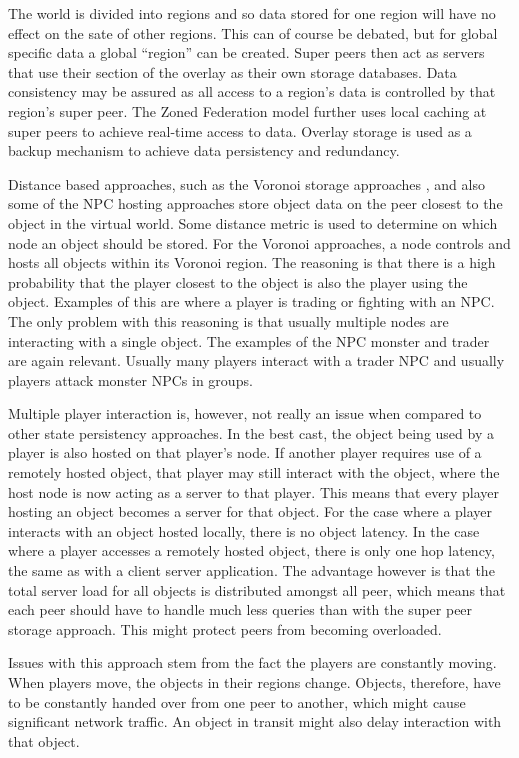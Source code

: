\documentclass[journal,oneside,a4paper,onecolumn]{IEEEtran}
\begin{document}
The world is divided into regions and so data stored for one region will have no effect on the sate of other regions. This can of course be debated, but for global specific data a global ``region'' can be created. Super peers then act as servers that use their section of the overlay as their own storage databases. Data consistency may be assured as all access to a region's data is controlled by that region's super peer. The Zoned Federation model further uses local caching at super peers to achieve real-time access to data. Overlay storage is used as a backup mechanism to achieve data persistency and redundancy.

Distance based approaches, such as the Voronoi storage approaches \cite{Buyukkaya_voronoi_state_management}, \cite{Hu_voronoi_IM} and also some of the NPC hosting approaches \cite{} store object data on the peer closest to the object in the virtual world. Some distance metric is used to determine on which node an object should be stored. For the Voronoi approaches, a node controls and hosts all objects within its Voronoi region. The reasoning is that there is a high probability that the player closest to the object is also the player using the object. Examples of this are where a player is trading or fighting with an NPC. The only problem with this reasoning is that usually multiple nodes are interacting with a single object. The examples of the NPC monster and trader are again relevant. Usually many players interact with a trader NPC and usually players attack monster NPCs in groups.

Multiple player interaction is, however, not really an issue when compared to other state persistency approaches. In the best cast, the object being used by a player is also hosted on that player's node. If another player requires use of a remotely hosted object, that player may still interact with the object, where the host node is now acting as a server to that player. This means that every player hosting an object becomes a server for that object. For the case where a player interacts with an object hosted locally, there is no object latency. In the case where a player accesses a remotely hosted object, there is only one hop latency, the same as with a client server application. The advantage however is that the total server load for all objects is distributed amongst all peer, which means that each peer should have to handle much less queries than with the super peer storage approach. This might protect peers from becoming overloaded.

Issues with this approach stem from the fact the players are constantly moving. When players move, the objects in their regions change. Objects, therefore, have to be constantly handed over from one peer to another, which might cause significant network traffic. An object in transit might also delay interaction with that object.
\end{document}
